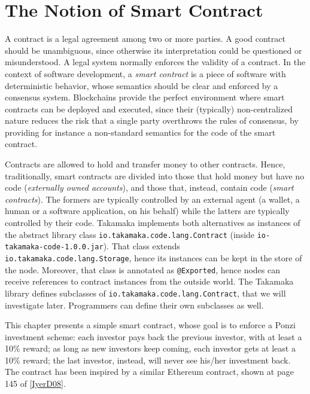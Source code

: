 \documentclass[a4paper,]{book}
\begin{document}
{\hypertarget{the-notion-of-smart-contract}{%
\chapter{The Notion of Smart Contract
}\label{the-notion-of-smart-contract}}

A contract is a legal agreement among two or more parties. A good
contract should be unambiguous, since otherwise its interpretation could
be questioned or misunderstood. A legal system normally enforces the
validity of a contract. In the context of software development, a
\emph{smart contract} is a piece of software with deterministic
behavior, whose semantics should be clear and enforced by a consensus
system. Blockchains provide the perfect environment where smart
contracts can be deployed and executed, since their (typically)
non-centralized nature reduces the risk that a single party overthrows
the rules of consensus, by providing for instance a non-standard
semantics for the code of the smart contract.

Contracts are allowed to hold and transfer money to other contracts.
Hence, traditionally, smart contracts are divided into those that hold
money but have no code (\emph{externally owned accounts}), and those
that, instead, contain code (\emph{smart contracts}). The formers are
typically controlled by an external agent (a wallet, a human or a
software application, on his behalf) while the latters are typically
controlled by their code. Takamaka implements both alternatives as
instances of the abstract library class
\texttt{io.takamaka.code.lang.Contract} (inside
\texttt{io-takamaka-code-1.0.0.jar}). That class extends
\texttt{io.takamaka.code.lang.Storage}, hence its instances can be kept
in the store of the node. Moreover, that class is annotated as
\texttt{@Exported}, hence nodes can receive references to contract
instances from the outside world. The Takamaka library defines
subclasses of \texttt{io.takamaka.code.lang.Contract}, that we will
investigate later. Programmers can define their own subclasses as well.

This chapter presents a simple smart contract, whose goal is to enforce
a Ponzi investment scheme: each investor pays back the previous
investor, with at least a 10\% reward; as long as new investors keep
coming, each investor gets at least a 10\% reward; the last investor,
instead, will never see his/her investment back. The contract has been
inspired by a similar Ethereum contract, shown at page 145 of
\protect\hyperlink{IyerD08}{{[}IyerD08{]}}.

}
\end{document}
